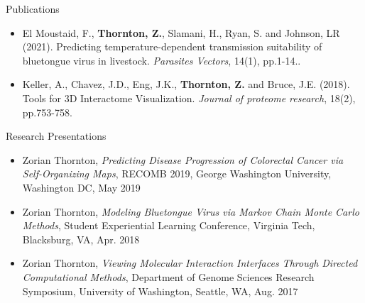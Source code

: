 \documentclass{resume} %
\begin{document}
\begin{rSection}{Publications}

\begin{itemize}

    \item El Moustaid, F., \textbf{Thornton, Z.}, Slamani, H., Ryan, S. and Johnson, LR (2021). Predicting temperature-dependent transmission suitability of bluetongue virus in livestock. \emph{Parasites Vectors}, 14(1), pp.1-14..

    \item Keller, A., Chavez, J.D., Eng, J.K., \textbf{Thornton, Z.} and Bruce, J.E. (2018). Tools for 3D Interactome Visualization. \emph{Journal of proteome research}, 18(2), pp.753-758.
\end{itemize}

\end{rSection}


\begin{rSection}{Research Presentations}
\begin{itemize}

    \item Zorian Thornton, \textit{Predicting Disease Progression of Colorectal Cancer via Self-Organizing Maps}, RECOMB 2019, George Washington University, Washington DC, May 2019

    \item Zorian Thornton, \textit{Modeling Bluetongue Virus via Markov Chain Monte Carlo Methods}, Student Experiential Learning Conference, Virginia Tech, Blacksburg, VA, Apr. 2018

    \item Zorian Thornton, \textit{Viewing Molecular Interaction Interfaces Through Directed Computational Methods}, Department of Genome Sciences Research Symposium, University of Washington, Seattle, WA, Aug. 2017

\end{itemize}


\end{rSection}


\end{document}
